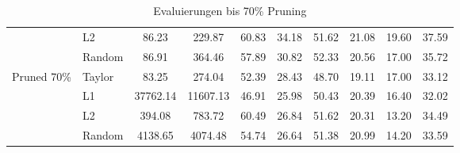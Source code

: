 \begin{table}[h]
{\begin{tabular}{l l | c c | c c c c c | r}
			                             & L2              & 86.23              & 229.87
			                             & 60.83           & 34.18              & 51.62
			                             & 21.08           & 19.60              & 37.59            \\


			                             & Random          & 86.91              & 364.46
			                             & 57.89           & 30.82              & 52.33
			                             & 20.56           & 17.00              & 35.72            \\

			\midrule
			\multirow{4}{*}{Pruned 70\%} & Taylor          & 83.25              & 274.04
			                             & 52.39           & 28.43              & 48.70
			                             & 19.11           & 17.00              & 33.12            \\

			                             & L1              & 37762.14           & 11607.13
			                             & 46.91           & 25.98              & 50.43
			                             & 20.39           & 16.40              & 32.02            \\


			                             & L2              & 394.08             & 783.72
			                             & 60.49           & 26.84              & 51.62
			                             & 20.31           & 13.20              & 34.49            \\


			                             & Random          & 4138.65            & 4074.48
			                             & 54.74           & 26.64              & 51.38
			                             & 20.99           & 14.20              & 33.59            \\
			\midrule
		\end{tabular}}
	\caption{Evaluierungen bis 70\% Pruning}
	\label{tab:pruning70}
\end{table}

